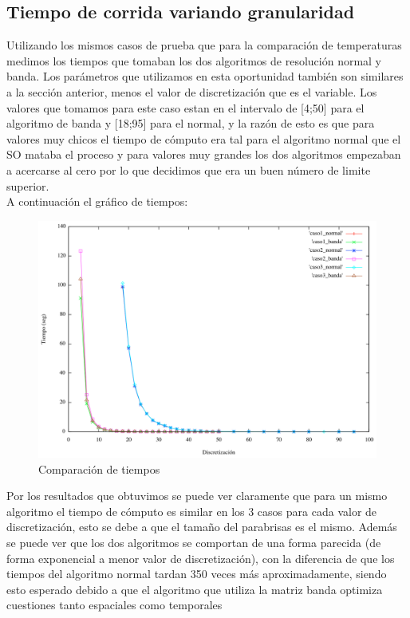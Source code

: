\subsection{Tiempo de corrida variando granularidad}
Utilizando los mismos casos de prueba que para la comparación de temperaturas medimos los tiempos que tomaban los dos algoritmos de resolución normal y banda. Los parámetros que utilizamos en esta oportunidad también son similares a la sección anterior, menos el valor de discretización que es el variable. Los valores que tomamos para este caso estan en el intervalo de [4;50] para el algoritmo de banda y [18;95] para el normal, y la razón de esto es que para valores muy chicos el tiempo de cómputo era tal para el algoritmo normal que el SO mataba el proceso y para valores muy grandes los dos algoritmos empezaban a acercarse al cero por lo que decidimos que era un buen número de limite superior. \\
A continuación el gráfico de tiempos:
\begin{figure}[htb]
\begin{center}
        \includegraphics[scale=0.5]{imagenes/comparacion_tiempos.png}
                \caption{Comparación de tiempos}
        \end{center}

\end{figure}

Por los resultados que obtuvimos se puede ver claramente que para un mismo algoritmo el tiempo de cómputo es similar en los 3 casos para cada valor de discretización, esto se debe a que el tamaño del parabrisas es el mismo. Además se puede ver que los dos algoritmos se comportan de una forma parecida (de forma exponencial a menor valor de discretización), con la diferencia de que los tiempos del algoritmo normal tardan 350 veces más aproximadamente, siendo esto esperado debido a que el algoritmo que utiliza la matriz banda optimiza cuestiones tanto espaciales como temporales
